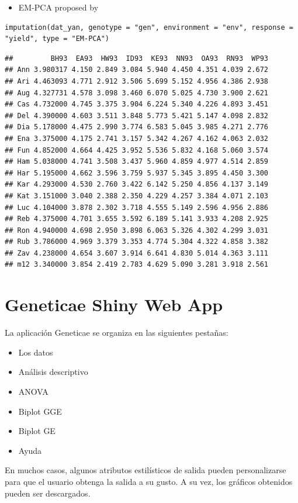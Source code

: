 \begin{itemize}
\item EM-PCA proposed by
\end{itemize}
\begin{lstlisting}
imputation(dat_yan, genotype = "gen", environment = "env", response = "yield", type = "EM-PCA")
\end{lstlisting}

\begin{verbatim}
##         BH93  EA93  HW93  ID93  KE93  NN93  OA93  RN93  WP93
## Ann 3.980317 4.150 2.849 3.084 5.940 4.450 4.351 4.039 2.672
## Ari 4.463093 4.771 2.912 3.506 5.699 5.152 4.956 4.386 2.938
## Aug 4.327731 4.578 3.098 3.460 6.070 5.025 4.730 3.900 2.621
## Cas 4.732000 4.745 3.375 3.904 6.224 5.340 4.226 4.893 3.451
## Del 4.390000 4.603 3.511 3.848 5.773 5.421 5.147 4.098 2.832
## Dia 5.178000 4.475 2.990 3.774 6.583 5.045 3.985 4.271 2.776
## Ena 3.375000 4.175 2.741 3.157 5.342 4.267 4.162 4.063 2.032
## Fun 4.852000 4.664 4.425 3.952 5.536 5.832 4.168 5.060 3.574
## Ham 5.038000 4.741 3.508 3.437 5.960 4.859 4.977 4.514 2.859
## Har 5.195000 4.662 3.596 3.759 5.937 5.345 3.895 4.450 3.300
## Kar 4.293000 4.530 2.760 3.422 6.142 5.250 4.856 4.137 3.149
## Kat 3.151000 3.040 2.388 2.350 4.229 4.257 3.384 4.071 2.103
## Luc 4.104000 3.878 2.302 3.718 4.555 5.149 2.596 4.956 2.886
## Reb 4.375000 4.701 3.655 3.592 6.189 5.141 3.933 4.208 2.925
## Ron 4.940000 4.698 2.950 3.898 6.063 5.326 4.302 4.299 3.031
## Rub 3.786000 4.969 3.379 3.353 4.774 5.304 4.322 4.858 3.382
## Zav 4.238000 4.654 3.607 3.914 6.641 4.830 5.014 4.363 3.111
## m12 3.340000 3.854 2.419 2.783 4.629 5.090 3.281 3.918 2.561
\end{verbatim}


\section{Geneticae Shiny Web App}

La aplicación Geneticae se organiza en las siguientes pestañas:
\begin{itemize}
\item Los datos
\item Análisis descriptivo
\item ANOVA
\item Biplot GGE
\item Biplot GE
\item Ayuda
\end{itemize}

En muchos casos, algunos atributos estilísticos de salida pueden personalizarse para que el usuario obtenga la salida a su gusto. A su vez, los gráficos obtenidos pueden ser descargados.


